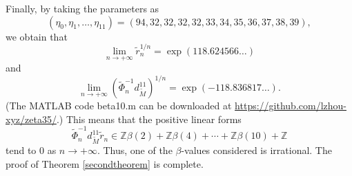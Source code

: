 \documentclass[11pt]{amsart}
\numberwithin{equation}{section}
\begin{document}
Finally, by taking the parameters as
\[ \left(\eta_{0}, \eta_{1}, \ldots, \eta_{11}\right)=(94,32,32,32,32,33,34,35,36,37,38,39), \]
we obtain that
\[ \lim _{n \rightarrow +\infty} \widetilde{r}_{n}^{1 / n}=\exp (118.624566 \ldots) \]
and
\[\lim _{n \rightarrow +\infty}\left(\widetilde{\Phi}_{n}^{-1} d_{\widetilde{M}}^{11}\right)^{1 / n}=\exp (-118.836817 \ldots).\]
(The MATLAB code \textsf{beta10.m} can be downloaded at \url{https://github.com/lzhou-xyz/zeta35/}.) This means that the positive linear forms
\[
\widetilde{\Phi}_{n}^{-1} d_{\widetilde{M}}^{11} \widetilde{r}_{n} \in \mathbb{Z} \beta(2)+\mathbb{Z} \beta(4)+\cdots+\mathbb{Z} \beta(10)+\mathbb{Z}
\]
tend to $0$ as $n \rightarrow +\infty$. Thus, one of the $\beta$-values considered is irrational. The proof of Theorem \ref{secondtheorem} is complete.
\end{document}
